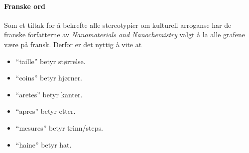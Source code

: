 \paragraph{Franske ord} Som et tiltak for å bekrefte alle stereotypier om kulturell arroganse har de franske forfatterne av \emph{Nanomaterials and Nanochemistry} valgt å la alle grafene være på fransk. Derfor er det nyttig å vite at 
\begin{itemize}
	\item ``taille'' betyr størrelse.
	\item ``coins'' betyr hjørner.
	\item ``aretes'' betyr kanter.
	\item ``apres'' betyr etter.
	\item ``mesures'' betyr trinn/steps.
	\item ``haine'' betyr hat.
\end{itemize}